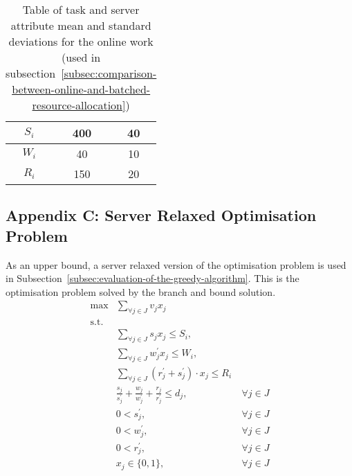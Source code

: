 \begin{table}[h]
\begin{minipage}{2.8in}
\begin{tabular}{|c|c|c|}
            $S_i$          & 400  & 40                 \\ \hline
            $W_i$          & 40   & 10                 \\ \hline
            $R_i$          & 150  & 20                 \\ \hline
        \end{tabular}
        \caption{Table of task and server attribute mean and standard deviations for the online work
        (used in subsection~\ref{subsec:comparison-between-online-and-batched-resource-allocation})}
    \end{minipage}
    \label{tab:synthetic-models}
\end{table}

\subsection*{Appendix C: Server Relaxed Optimisation Problem}
As an upper bound, a server relaxed version of the optimisation problem is used in
Subsection~\ref{subsec:evaluation-of-the-greedy-algorithm}. This is the optimisation problem solved by the branch and
bound solution.
\begin{align}
    \max & \sum_{\forall j \in J} v_j x_j \label{eq:relaxed-objective} \\
    \mbox{s.t.} \nonumber \\
    & \sum_{\forall j \in J} s_j x_j \leq S_i, \label{eq:relaxed-server-storage-constraint} \\
    & \sum_{\forall j \in J} w^{'}_j x_j \leq W_i,  \label{eq:relaxed-server-computation-constraint} \\
    & \sum_{\forall j \in J} (r^{'}_j + s^{'}_j) \cdot x_j \leq R_i \label{eq:relaxed-server-bandwidth-constraint} \\
    & \frac{s_j}{s^{'}_j} + \frac{w_j}{w^{'}_j} + \frac{r_j}{r^{'}_j} \leq d_j, &~ \forall{j \in J} \label{eq:relaxed-task-deadline} \\
    & 0 < s^{'}_j, &~ \forall{j \in J} \label{eq:relaxed-loading-speeds} \\
    & 0 < w^{'}_j, &~ \forall{j \in J} \label{eq:relaxed-compute-speeds} \\
    & 0 < r^{'}_j, &~ \forall{j \in J} \label{eq:relaxed-sending-speeds} \\
    & x_j \in \{0, 1\}, &~ \forall{j \in J} \label{eq:relaxed-task-allocation}
\end{align}